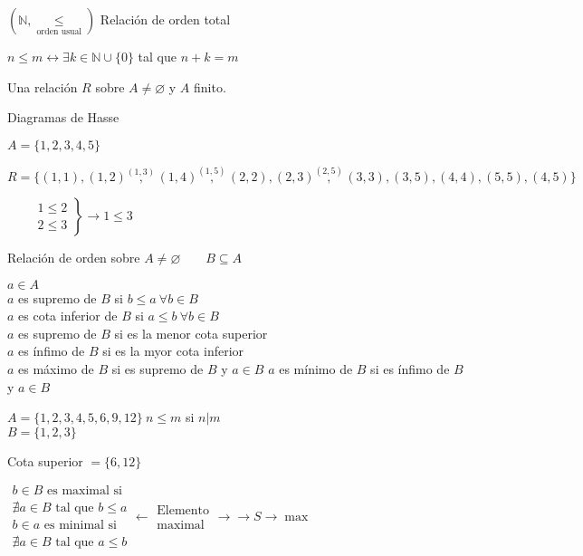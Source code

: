 \documentclass[12pt]{article}
\renewcommand{\arraystretch}{1.15}
\begin{document}
$(\mathbb{N},\underset{
\text{orden usual}
}{\le})$ Relación de orden total

$n\le m \leftrightarrow \exists k\in\mathbb{N}\cup\{0\}$ tal que $n+k=m$

Una relación $R$ sobre $A\neq\varnothing$ y $A$ finito.

Diagramas de Hasse

$A=\{1,2,3,4,5\}$

$R=\{(1,1),(1,2)\overset{(1,3)}{,}(1,4)\overset{(1,5)}{,}(2,2),(2,3)\overset{(2,5)}{,}(3,3),(3,5),(4,4),(5,5),(4,5)\}$

$\qquad\left.\begin{array}{c}
1\le 2\\
2\le 3
\end{array}\right\}\rightarrow 1\le 3$

Relación de orden sobre $A\neq\varnothing\qquad B\subseteq A$ 

$a\in A$\\
$a$ es supremo de $B$ si $b\le a~\forall b\in B$\\
$a$ es cota inferior de $B $ si $a\le b~\forall b\in B$\\
$a$ es supremo de $B$ si es la menor cota superior\\
$a$ es ínfimo de $B$ si es la myor cota inferior\\
$a$ es máximo de $B$ si es supremo de $B$ y $a\in B$
$a$ es mínimo de $B$ si es ínfimo de $B$ y $a\in B$

$A=\{1,2,3,4,5,6,9,12\}~n\le m$ si $n|m$ \\
$B=\{1,2,3\}$

Cota superior $=\{6, 12\}$

{\renewcommand{\arraystretch}{1} $\begin{array}{l}
	b\in B\text{ es maximal si }\\
	\nexists a\in B \text{ tal que } b\le a\\
	b\in a\text{ es minimal si }\\
	\nexists a\in B\text{ tal que }a\le b 
\end{array}\leftarrow \begin{array}{l}
\text{Elemento} \\
\text{maximal}
\end{array}\rightarrow$$\rightarrow S\rightarrow\max$}
\end{document}
